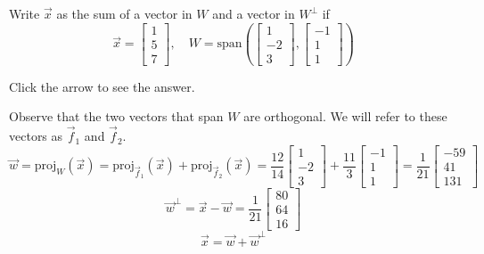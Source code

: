 \documentclass{ximera}
\begin{document}
\begin{problem}\label{OrthoDecomp1} Write $\vec{x}$ as the sum of a vector in $W$ and a vector in $W^\perp$ if
$$\vec{x} = \begin{bmatrix}1\\ 5\\ 7\end{bmatrix},\quad W = \mbox{span}\left(\begin{bmatrix}1\\ -2\\ 3\end{bmatrix}, \begin{bmatrix}-1\\ 1\\ 1\end{bmatrix}\right)$$

Click the arrow to see the answer.
\begin{expandable}
Observe that the two vectors that span $W$ are orthogonal.  We will refer to these vectors as $\vec{f}_1$ and $\vec{f}_2$.
$$\vec{w}=\text{proj}_W(\vec{x})=\text{proj}_{\vec{f}_1}(\vec{x})+\text{proj}_{\vec{f}_2}(\vec{x})=\frac{12}{14}\begin{bmatrix}1\\-2\\3\end{bmatrix}+\frac{11}{3}\begin{bmatrix}-1\\1\\1\end{bmatrix}=\frac{1}{21}\begin{bmatrix}-59\\41\\131\end{bmatrix}$$
$$\vec{w}^{\perp}=\vec{x}-\vec{w}=\frac{1}{21}\begin{bmatrix}80\\64\\16\end{bmatrix}$$
$$\vec{x}=\vec{w}+\vec{w}^{\perp}$$
\end{expandable}
\end{problem}
\end{document}
